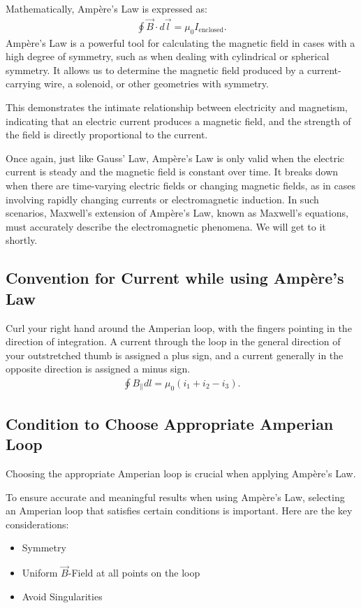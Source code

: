 \documentclass[12pt,b4paper]{article}
\begin{document}
Mathematically, Ampère's Law is expressed as:
\begin{align}
    \oint\Vec{B}\cdot d\Vec{l}=\mu_0 I_\text{enclosed}.\label{eq:ampere-law}
\end{align}
Ampère's Law is a powerful tool for calculating the magnetic field in cases with a high degree of symmetry, such as when dealing with cylindrical or spherical symmetry. It allows us to determine the magnetic field produced by a current-carrying wire, a solenoid, or other geometries with symmetry.

This demonstrates the intimate relationship between electricity and magnetism, indicating that an electric current produces a magnetic field, and the strength of the field is directly proportional to the current.

Once again, just like Gauss' Law, Ampère's Law is only valid when the electric current is steady and the magnetic field is constant over time. It breaks down when there are time-varying electric fields or changing magnetic fields, as in cases involving rapidly changing currents or electromagnetic induction. In such scenarios, Maxwell's extension of Ampère's Law, known as Maxwell's equations, must accurately describe the electromagnetic phenomena. We will get to it shortly.
\subsection*{Convention for Current while using Ampère's Law}
Curl your right hand around the Amperian loop, with the fingers pointing in the direction of integration. A current through the loop in the general direction of your outstretched thumb is assigned a plus sign, and a current generally in the opposite direction is assigned a minus sign.
\begin{align*}
    \oint B_\parallel dl=\mu_0 (i_1+i_2-i_3).
\end{align*}
\subsection*{Condition to Choose Appropriate Amperian Loop}
Choosing the appropriate Amperian loop is crucial when applying Ampère's Law.

To ensure accurate and meaningful results when using Ampère's Law, selecting an Amperian loop that satisfies certain conditions is important. Here are the key considerations:
\begin{itemize}
\setlength{\itemsep}{0pt}
    \item Symmetry
    \item Uniform $\vec{B}$-Field at all points on the loop
    \item Avoid Singularities
\end{itemize}
\end{document}
